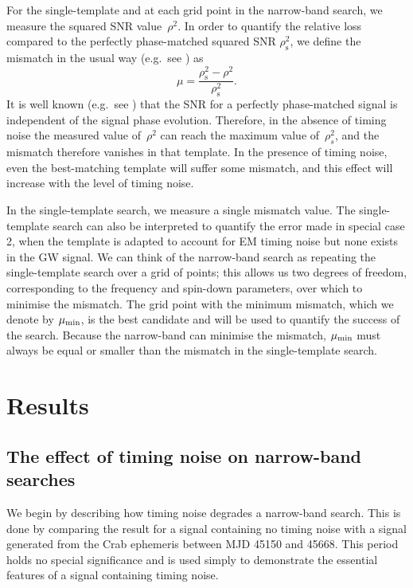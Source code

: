 \documentclass[../full_thesis/full_thesis.tex]{subfiles}
\begin{document}
For the single-template and at each grid point in the narrow-band search, we
measure the squared SNR value~$\rho^{2}$.  In order to quantify the relative
loss compared to the perfectly phase-matched squared SNR
$\rho^{2}_{\mathrm{s}}$, we define the mismatch in the usual way (e.g.\ see
\citet{Prix2007}) as
\begin{equation}
    \mu = \frac{{\rho^{2}_{\mathrm{s}} -
                                  \rho^{2}}}{\rho^{2}_{\mathrm{s}}}.
\label{eqn:mismatch}
\end{equation}
It is well known (e.g.\ see \citet{Prix2009}) that the SNR for a
perfectly phase-matched signal is independent of the signal phase
evolution. Therefore, in the absence of timing
noise the measured value of~$\rho^{2}$ can reach the maximum value
of~$\rho^{2}_{s}$, and the mismatch therefore vanishes in that template.
In the presence of timing noise, even the best-matching template will
suffer some mismatch, and this effect will increase with the level of
timing noise.

In the single-template search, we measure a single mismatch value.  The
single-template search can also be interpreted to quantify the error made in
special case 2, when the template is adapted to account for EM timing noise but
none exists in the GW signal.  We can think of the narrow-band search as
repeating the single-template search over a grid of points; this allows us two
degrees of freedom, corresponding to the frequency and spin-down parameters,
over which to minimise the mismatch. The grid point with the minimum mismatch,
which we denote by $\mu_{\mathrm{min}}$, is the best candidate and will be used to quantify
the success of the search.  Because the narrow-band can minimise the mismatch,
$\mu_{\mathrm{min}}$ must always be equal or smaller than the mismatch in the
single-template search.


\section{Results}
\label{sec: narrow-band results}
\subsection{The effect of timing noise on narrow-band searches} We begin by
describing how timing noise degrades a narrow-band search. This is done by
comparing the result for a signal containing no timing noise with a signal
generated from the Crab ephemeris between MJD 45150 and 45668. This period
holds no special significance and is used simply to demonstrate the essential
features of a signal containing timing noise.
\end{document}
